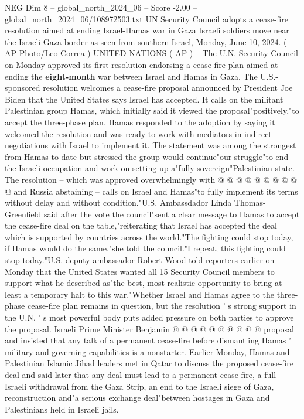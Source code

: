 \begin{textsample}{NEG Dim 8 – global\_north\_2024\_06 – Score -2.00 – global\_north\_2024\_06/108972503.txt}  \label{ex:f8_neg_188}
UN Security Council adopts a cease-fire resolution aimed at ending Israel-Hamas war in Gaza Israeli soldiers move near the Israeli-Gaza border as seen from southern Israel, Monday, June 10, 2024. ( AP Photo/Leo Correa ) UNITED NATIONS ( AP ) -- The U.N.
Security Council on Monday approved its first resolution endorsing a cease-fire plan aimed at ending the \textbf{eight-month} war between Israel and Hamas in Gaza.
The U.S.-sponsored resolution welcomes a cease-fire proposal announced by President Joe Biden that the United States says Israel has accepted.
It calls on the militant Palestinian group Hamas, which initially said it viewed the proposal"positively,"to accept the three-phase plan.
Hamas responded to the adoption by saying it welcomed the resolution and was ready to work with mediators in indirect negotiations with Israel to implement it.
The statement was among the strongest from Hamas to date but stressed the group would continue"our struggle"to end the Israeli occupation and work on setting up a"fully sovereign"Palestinian state.
The resolution -- which was approved overwhelmingly with @ @ @ @ @ @ @ @ @ @ and Russia abstaining -- calls on Israel and Hamas"to fully implement its terms without delay and without condition."U.S.
Ambassdador Linda Thomas-Greenfield said after the vote the council"sent a clear message to Hamas to accept the cease-fire deal on the table,"reiterating that Israel has accepted the deal which is supported by countries across the world."The fighting could stop today, if Hamas would do the same,"she told the council."I repeat, this fighting could stop today."U.S. deputy ambassador Robert Wood told reporters earlier on Monday that the United States wanted all 15 Security Council members to support what he described as"the best, most realistic opportunity to bring at least a temporary halt to this war."Whether Israel and Hamas agree to the three-phase cease-fire plan remains in question, but the resolution ' s strong support in the U.N. ' s most powerful body puts added pressure on both parties to approve the proposal.
Israeli Prime Minister Benjamin @ @ @ @ @ @ @ @ @ @ proposal and insisted that any talk of a permanent cease-fire before dismantling Hamas ' military and governing capabilities is a nonstarter.
Earlier Monday, Hamas and Palestinian Islamic Jihad leaders met in Qatar to discuss the proposed cease-fire deal and said later that any deal must lead to a permanent cease-fire, a full Israeli withdrawal from the Gaza Strip, an end to the Israeli siege of Gaza, reconstruction and"a serious exchange deal"between hostages in Gaza and Palestinians held in Israeli jails.

\end{textsample}
